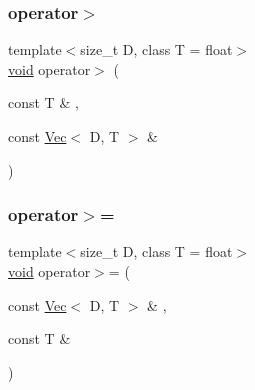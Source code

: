\mbox{\label{classtrimesh_1_1Vec_a45e1015472d8768338d62e67e791c8dc}} 
\subsubsection{\texorpdfstring{operator$>$}{operator>}\hspace{0.1cm}{\footnotesize\ttfamily [2/2]}}
{\footnotesize\ttfamily template$<$size\+\_\+t D, class T = float$>$ \\
\hyperlink{namespacetrimesh_a784ddfd979e1c579bda795a8edfc3f43}{void} operator$>$ (\begin{DoxyParamCaption}\item[{const T \&}]{,  }\item[{const \hyperlink{classtrimesh_1_1Vec}{Vec}$<$ D, T $>$ \&}]{ }\end{DoxyParamCaption})\hspace{0.3cm}{\ttfamily [friend]}}

\mbox{\label{classtrimesh_1_1Vec_a1a9335cea2eb49678d55dfd0a3c16de2}} 
\subsubsection{\texorpdfstring{operator$>$=}{operator>=}\hspace{0.1cm}{\footnotesize\ttfamily [1/2]}}
{\footnotesize\ttfamily template$<$size\+\_\+t D, class T = float$>$ \\
\hyperlink{namespacetrimesh_a784ddfd979e1c579bda795a8edfc3f43}{void} operator$>$= (\begin{DoxyParamCaption}\item[{const \hyperlink{classtrimesh_1_1Vec}{Vec}$<$ D, T $>$ \&}]{,  }\item[{const T \&}]{ }\end{DoxyParamCaption})\hspace{0.3cm}{\ttfamily [friend]}}

\mbox{\label{classtrimesh_1_1Vec_aa2cf9fbecb5838b5d4b8e04030e56fb1}} 
